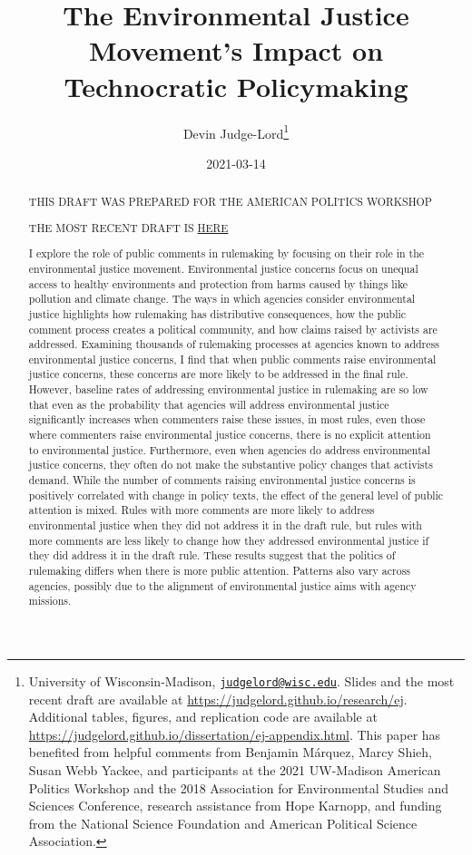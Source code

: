 \documentclass[
      12pt,
        ]{article}
\title{The Environmental Justice Movement's Impact on Technocratic Policymaking}
\author{ %
            Devin Judge-Lord\footnote{University of Wisconsin-Madison, \href{mailto:judgelord@wisc.edu}{\nolinkurl{judgelord@wisc.edu}}. Slides and the most recent draft are available at \url{https://judgelord.github.io/research/ej}. Additional tables, figures, and replication code are available at \url{https://judgelord.github.io/dissertation/ej-appendix.html}. This paper has benefited from helpful comments from Benjamin Márquez, Marcy Shieh, Susan Webb Yackee, and participants at the 2021 UW-Madison American Politics Workshop and the 2018 Association for Environmental Studies and Sciences Conference, research assistance from Hope Karnopp, and funding from the National Science Foundation and American Political Science Association.} 
            }
\date{2021-03-14}
\begin{document}
 


  \maketitle




  \begin{abstract}
    \noindent THIS DRAFT WAS PREPARED FOR THE AMERICAN POLITICS WORKSHOP

THE MOST RECENT DRAFT IS \href{https://judgelord.github.io/research/ej/}{HERE}

\bigskip

I explore the role of public comments in rulemaking by focusing on their role in the environmental justice movement. Environmental justice concerns focus on unequal access to healthy environments and protection from harms caused by things like pollution and climate change. The ways in which agencies consider environmental justice highlights how rulemaking has distributive consequences, how the public comment process creates a political community, and how claims raised by activists are addressed. Examining thousands of rulemaking processes at agencies known to address environmental justice concerns, I find that when public comments raise environmental justice concerns, these concerns are more likely to be addressed in the final rule. However, baseline rates of addressing environmental justice in rulemaking are so low that even as the probability that agencies will address environmental justice significantly increases when commenters raise these issues, in most rules, even those where commenters raise environmental justice concerns, there is no explicit attention to environmental justice. Furthermore, even when agencies do address environmental justice concerns, they often do not make the substantive policy changes that activists demand. While the number of comments raising environmental justice concerns is positively correlated with change in policy texts, the effect of the general level of public attention is mixed. Rules with more comments are more likely to address environmental justice when they did not address it in the draft rule, but rules with more comments are less likely to change how they addressed environmental justice if they did address it in the draft rule. These results suggest that the politics of rulemaking differs when there is more public attention. Patterns also vary across agencies, possibly due to the alignment of environmental justice aims with agency missions. 

    

  \end{abstract}
\end{document}
